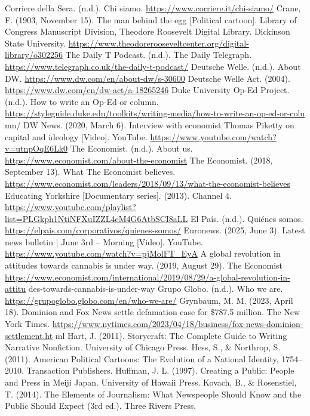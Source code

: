 \begin{referencelist}
   Corriere della Sera. (n.d.). Chi siamo. \url{https://www.corriere.it/chi-siamo/}
   Crane, F. (1903, November 15). The man behind the egg [Political cartoon]. Library of Congress Manuscript Division, Theodore Roosevelt Digital Library. Dickinson State University. \url{https://www.theodorerooseveltcenter.org/digital-library/o302256}
   The Daily T Podcast. (n.d.). The Daily Telegraph. \url{https://www.telegraph.co.uk/the-daily-t-podcast/}
   Deutsche Welle. (n.d.). About DW. \url{https://www.dw.com/en/about-dw/s-30600}
   Deutsche Welle Act. (2004). \url{https://www.dw.com/en/dw-act/a-18265246}
   Duke University Op-Ed Project. (n.d.). How to write an Op-Ed or column. \url{https://styleguide.duke.edu/toolkits/writing-media/how-to-write-an-op-ed-or-colu} mn/
   DW News. (2020, March 6). Interview with economist Thomas Piketty on capital and ideology [Video]. YouTube. \url{https://www.youtube.com/watch?v=utnpOqE6Lk0}
   The Economist. (n.d.). About us. \url{https://www.economist.com/about-the-economist}
   The Economist. (2018, September 13). What The Economist believes. \url{https://www.economist.com/leaders/2018/09/13/what-the-economist-believes}
   Educating Yorkshire [Documentary series]. (2013). Channel 4. \url{https://www.youtube.com/playlist?list=PLGkph1NtiNFXuIZZL4eM4G6AtbSCI8aLL}
   El País. (n.d.). Quiénes somos. \url{https://elpais.com/corporativos/quienes-somos/}
   Euronews. (2025, June 3). Latest news bulletin | June 3rd – Morning [Video]. YouTube. \url{https://www.youtube.com/watch?v=pjMolFT_EyA}
   A global revolution in attitudes towards cannabis is under way. (2019, August 29). The Economist \url{https://www.economist.com/international/2019/08/29/a-global-revolution-in-attitu} des-towards-cannabis-is-under-way
   Grupo Globo. (n.d.). Who we are. \url{https://grupoglobo.globo.com/en/who-we-are/}
   Grynbaum, M. M. (2023, April 18). Dominion and Fox News settle defamation case for \$787.5 million. The New York Times. \url{https://www.nytimes.com/2023/04/18/business/fox-news-dominion-settlement.ht} ml
   Hart, J. (2011). Storycraft: The Complete Guide to Writing Narrative Nonfiction. University of Chicago Press.
   Hess, S., \& Northrop, S. (2011). American Political Cartoons: The Evolution of a National Identity, 1754–2010. Transaction Publishers.
   Huffman, J. L. (1997). Creating a Public: People and Press in Meiji Japan. University of Hawaii Press.
   Kovach, B., \& Rosenstiel, T. (2014). The Elements of Journalism: What Newspeople Should Know and the Public Should Expect (3rd ed.). Three Rivers Press.

\end{referencelist}
